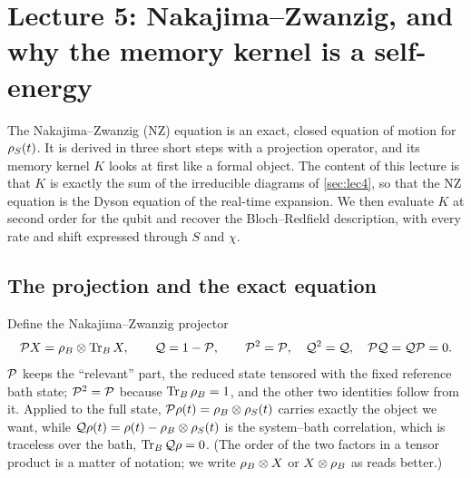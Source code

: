 \section{Lecture 5: Nakajima--Zwanzig, and why the memory kernel is a self-energy}
\label{sec:lec5}

The Nakajima--Zwanzig (NZ) equation is an exact, closed equation of motion for $\rho_{S}(t)$.
It is derived in three short steps with a projection operator, and its memory kernel $K$ looks at first like a formal object.
The content of this lecture is that $K$ is exactly the sum of the irreducible diagrams of \cref{sec:lec4}, so that the NZ equation is the Dyson equation of the real-time expansion.
We then evaluate $K$ at second order for the qubit and recover the Bloch--Redfield description, with every rate and shift expressed through $S$ and $\chi$.

\subsection{The projection and the exact equation}
\label{sec:nz-derivation}

Define the Nakajima--Zwanzig projector~\cite{Nakajima1958,Zwanzig1960}
\begin{equation}
  \mathcal{P} X=\rho_{B}\otimes\operatorname{Tr}_B X,\qquad \mathcal{Q}=1-\mathcal{P},\qquad \mathcal{P}^2=\mathcal{P},\quad \mathcal{Q}^2=\mathcal{Q},\quad \mathcal{P}\mathcal{Q}=\mathcal{Q}\mathcal{P}=0 .
  \label{eq:P}
\end{equation}
$\mathcal{P}$ keeps the ``relevant'' part, the reduced state tensored with the fixed reference bath state; $\mathcal{P}^2=\mathcal{P}$ because $\operatorname{Tr}_B\rho_{B}=1$, and the other two identities follow from it.
Applied to the full state, $\mathcal{P}\rho(t)=\rho_{B}\otimes\rho_{S}(t)$ carries exactly the object we want, while $\mathcal{Q}\rho(t)=\rho(t)-\rho_{B}\otimes\rho_{S}(t)$ is the system--bath correlation, which is traceless over the bath, $\operatorname{Tr}_B\mathcal{Q}\rho=0$.
(The order of the two factors in a tensor product is a matter of notation; we write $\rho_{B}\otimes X$ or $X\otimes\rho_{B}$ as reads better.)

